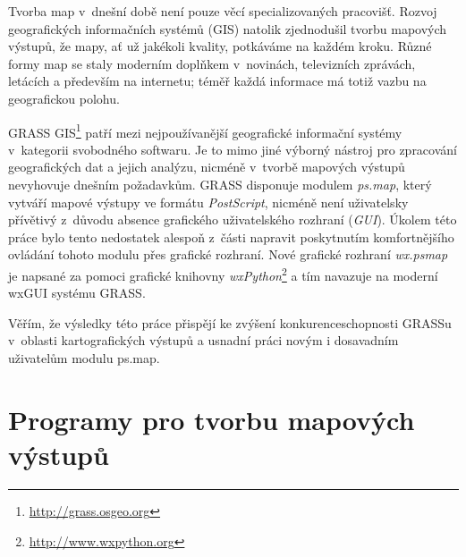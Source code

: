 \documentclass[a4paper,12pt,draft]{article}
\newif\ifbc %
\newcommand{\modul}[1]{\emph{#1}}
\begin{document}
Tvorba map v~dnešní době není pouze věcí specializovaných
pracovišť. Rozvoj geografických informačních systémů (GIS) natolik
zjednodušil tvorbu mapových výstupů, že mapy, ať už jakékoli kvality,
potkáváme na každém kroku. Různé formy map se staly moderním doplňkem
v~novinách, televizních zprávách, letácích a pře\-devším na internetu;
téměř každá informace má totiž vazbu na geografickou polohu.

\ifbc
Definic geografického informačního systému existuje mnoho
a další časem pravdě\-podobně ještě vzniknou, jak se bude tato oblast
vyvíjet. Někteří odborníci v~definicích vyzdvihují význam složky
datové, jiní zas analytické, v~souvislosti s~tématem této práce je
ale důležité především kartografické znázornění dat.
\fi

GRASS GIS\footnote{\url{http://grass.osgeo.org}} patří mezi nejpoužívanější
geografické informační
systémy v~kategorii svobodného softwaru. Je to mimo jiné výborný nástroj
pro zpracování geografických dat  a jejich analýzu, nicméně v~tvorbě mapových
výstupů nevyhovuje dnešním požadavkům. GRASS disponuje modulem \modul{ps.map},
který
vytváří mapové výstupy ve formátu \emph{PostScript}, nicméně není uživatelsky
přívětivý z~důvodu absence grafického uživatelského rozhraní (\emph{GUI}).
Úkolem této práce
bylo tento nedostatek alespoň z~části napravit  poskytnutím
komfortnějšího ovládání tohoto modulu přes grafické rozhraní.
Nové grafické rozhraní \emph{wx.psmap} je napsané za pomoci grafické knihovny
\emph{wxPython}\footnote{\url{http://www.wxpython.org}} a tím navazuje na
moderní wxGUI \cite{wxGUI_clanek} systému GRASS.

\ifbc
Součástí práce bylo i prozkoumání možností několika komerčních i nekomerčních
programů z~hlediska jejich kartografických výstupů. Soustředila jsem se spíše
na konkrétní vlastnosti, které mne určitým způsobem zaujaly, než na kompletní
rozbor funkcionality. Následuje i porovnání jejich grafických rozhraní, která
zásadně ovlivňují použitelnost programů a také jejich oblíbenost. Vyšla jsem
z~obecných zásad tvorby grafického rozhraní, doplněných jasnými příklady jejich
nerespektování.
\fi

Věřím, že výsledky této práce přispějí ke zvýšení konkurenceschopnosti GRASSu
 v~oblasti kartografických výstupů a usnadní práci novým i dosavadním
uživatelům modulu ps.map.

\ifbc
\newpage
\section{Programy pro tvorbu mapových výstupů}
\end{document}
